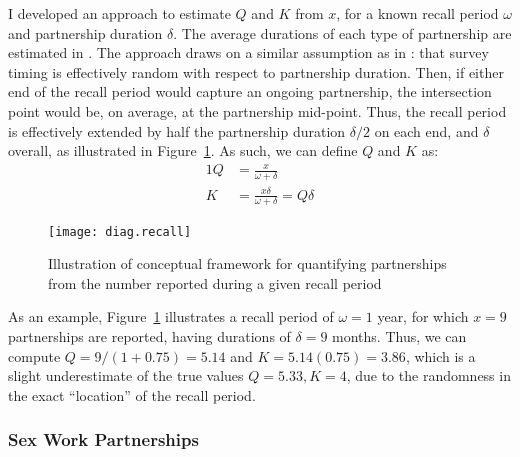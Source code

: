 \par
I developed an approach to estimate $Q$ and $K$ from $x$,
for a known recall period $\omega$ and partnership duration $\delta$.
The average durations of each type of partnership are estimated in .
The approach draws on a similar assumption as in :
that survey timing is effectively random with respect to partnership duration.
Then, if either end of the recall period would capture an ongoing partnership,
the intersection point would be, on average, at the partnership mid-point.
Thus, the recall period is effectively extended
by half the partnership duration $\delta/2$ on each end, and $\delta$ overall,
as illustrated in Figure~\ref{fig:diag.recall}.
As such, we can define $Q$ and $K$ as:
\begin{alignat}{1}
  Q &= \frac{x}{\omega+\delta} \label{eq:x2Q}\\
  K &= \frac{x\delta}{\omega+\delta} = Q\delta \label{eq:x2K}
\end{alignat}
\begin{figure}
  \centering
  \texttt{[image: diag.recall]}
  \caption{Illustration of conceptual framework for quantifying partnerships
    from the number reported during a given recall period}
  \label{fig:diag.recall}
\end{figure}
\par
As an example, Figure~\ref{fig:diag.recall} illustrates
a recall period of $\omega = 1$ year,
for which $x = 9$ partnerships are reported,
having durations of $\delta = 9$ months.
Thus, we can compute $Q = 9/(1+0.75) = 5.14$ and $K = 5.14(0.75) = 3.86$,
which is a slight underestimate of the true values $Q = 5.33, K = 4$,
due to the randomness in the exact ``location'' of the recall period.
\subsubsection{Sex Work Partnerships}\label{model.par.pnum.sw}

